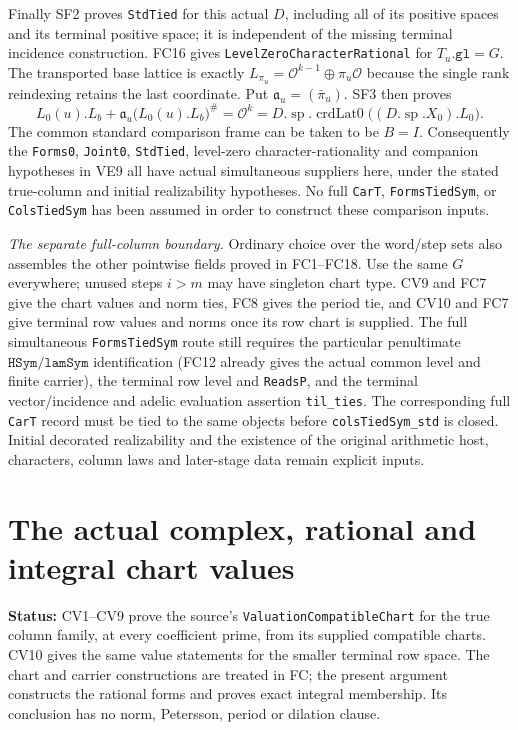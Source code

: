 \documentclass[11pt,a4paper]{article}
\numberwithin{equation}{section}
\theoremstyle{remark}\newtheorem{remark}[theorem]{Remark}
\newcommand{\status}[1]{\textbf{Status:} #1}
\begin{document}
Finally SF2 proves \texttt{StdTied} for this actual $D$, including
all of its positive spaces and its terminal positive space; it is
independent of the missing terminal incidence construction. FC16 gives
\texttt{LevelZeroCharacterRational} for $T_u.\texttt{gl}=G$.
The transported base lattice is exactly
$L_{\pi_u}=\mathcal O^{k-1}\oplus\pi_u\mathcal O$ because the
single rank reindexing retains the last coordinate. Put
$\mathfrak a_u=(\bar\pi_u)$. SF3 then proves
\[
 L_0(u).L_b+\mathfrak a_u\bigl(L_0(u).L_b\bigr)^\#
       =\mathcal O^k
       =D.\operatorname{sp}.\operatorname{crdLat0}
                         \bigl((D.\operatorname{sp}.X_0).L_0\bigr).
 \tag{FC.41}
\]
The common standard comparison frame can be taken to be $B=I$.
Consequently the \texttt{Forms0}, \texttt{Joint0}, \texttt{StdTied},
level-zero character-rationality and companion hypotheses in VE9 all
have actual simultaneous suppliers here, under the stated true-column
and initial realizability hypotheses. No full \texttt{CarT},
\texttt{FormsTiedSym}, or \texttt{ColsTiedSym} has been assumed in
order to construct these comparison inputs.

\emph{The separate full-column boundary.}
Ordinary choice over the word/step sets also assembles the other
pointwise fields proved in FC1--FC18. Use the same $G$ everywhere;
unused steps $i>m$ may have singleton chart type. CV9 and FC7 give
the chart values and norm ties, FC8 gives the period tie, and CV10
and FC7 give terminal row values and norms once its row chart is
supplied. The full simultaneous \texttt{FormsTiedSym} route still
requires the particular penultimate $\texttt{HSym}/\texttt{lamSym}$
identification (FC12 already gives the actual common level and finite
carrier), the terminal row level and \texttt{ReadsP}, and the terminal
vector/incidence and adelic evaluation assertion \texttt{til\_\allowbreak ties}.
The corresponding full \texttt{CarT} record must be tied to the same
objects before \texttt{colsTiedSym\_\allowbreak std} is closed. Initial decorated
realizability and the existence of the original arithmetic host,
characters, column laws and later-stage data remain explicit inputs.


\section{The actual complex, rational and integral chart values}
\label{sec:chart-values}

\status{CV1--CV9 prove the source's
\texttt{ValuationCompatibleChart} for the true column family, at every
coefficient prime, from its supplied compatible charts. CV10 gives the
same value statements for the smaller terminal row space. The chart
and carrier constructions are treated in FC; the present argument
constructs the rational forms and proves exact integral membership.
Its conclusion has no norm, Petersson, period or dilation clause.}
\end{document}
